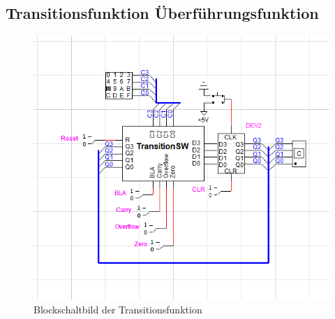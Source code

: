 \subsection{Transitionsfunktion Überführungsfunktion}
\label{sec:transitionsfunktion}

\begin{figure}[ht]
    \centering
    \includegraphics[scale=0.6]
    {content/figures/Transitionsfunktion.png}
    \caption{Blockschaltbild der Transitionsfunktion}
    \label{fig:blockschaltbild-transitionsfunktion}
\end{figure}

